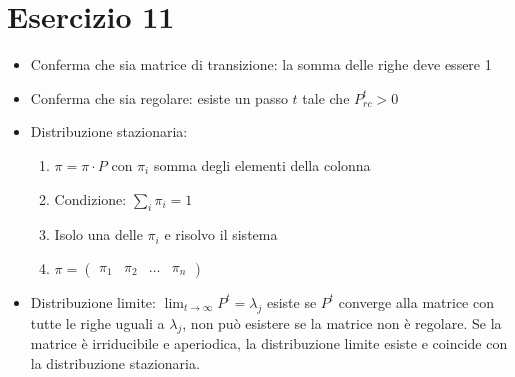 \documentclass[12pt]{article}
\begin{document}
\section{Esercizio 11}
\begin{itemize}
    \item Conferma che sia matrice di transizione: la somma delle righe deve essere 1
    \item Conferma che sia regolare: esiste un passo $t$ tale che $P^{t}_{rc}>0$
    \item Distribuzione stazionaria:\begin{enumerate}
        \item $\pi = \pi\cdot P$ con $\pi_{i}$ somma degli elementi della colonna
        \item Condizione: $\sum_{i}\pi_{i}=1$
        \item Isolo una delle $\pi_{i}$ e risolvo il sistema
        \item $\pi = \begin{pmatrix}
            \pi_{1} & \pi_{2} & \ldots & \pi_{n}
        \end{pmatrix}$
    \end{enumerate} 
    \item Distribuzione limite: $\lim_{t\to\infty}P^{t} = \lambda_{j}$ esiste se $P^{t}$ converge alla matrice con tutte le righe uguali a $\lambda_{j}$, non può esistere se la matrice non è regolare. Se la matrice è irriducibile e aperiodica, la distribuzione limite esiste e coincide con la distribuzione stazionaria.
\end{itemize}
\end{document}
